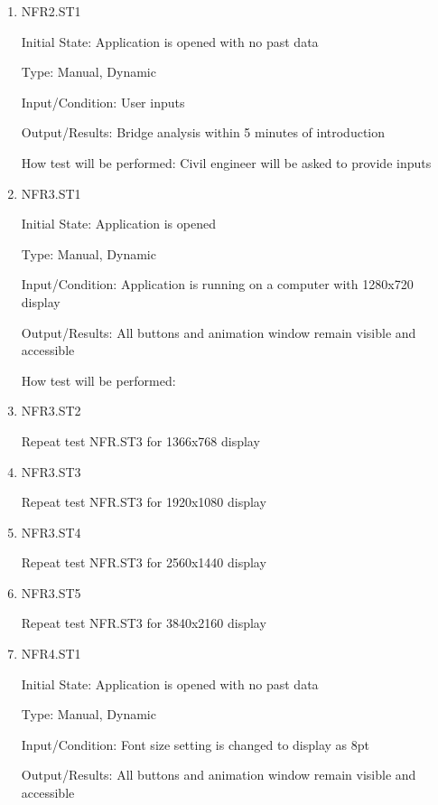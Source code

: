 \documentclass[12pt, titlepage]{article}
\begin{document}
\begin{enumerate}

\item{NFR2.ST1\\}

Initial State: Application is opened with no past data

Type: Manual, Dynamic

Input/Condition: User inputs

Output/Results: Bridge analysis within 5 minutes of introduction

How test will be performed: Civil engineer will be asked to provide inputs

\item{NFR3.ST1\\}

Initial State: Application is opened

Type: Manual, Dynamic

Input/Condition: Application is running on a computer with 1280x720 display

Output/Results: All buttons and animation window remain visible and accessible

How test will be performed: 

\item{NFR3.ST2\\}

Repeat test NFR.ST3 for 1366x768 display

\item{NFR3.ST3\\}

Repeat test NFR.ST3 for 1920x1080 display

\item{NFR3.ST4\\}

Repeat test NFR.ST3 for 2560x1440 display

\item{NFR3.ST5\\}

Repeat test NFR.ST3 for 3840x2160 display

\item{NFR4.ST1\\}

Initial State: Application is opened with no past data

Type: Manual, Dynamic

Input/Condition: Font size setting is changed to display as 8pt

Output/Results: All buttons and animation window remain visible and accessible


\end{enumerate}
\end{document}
